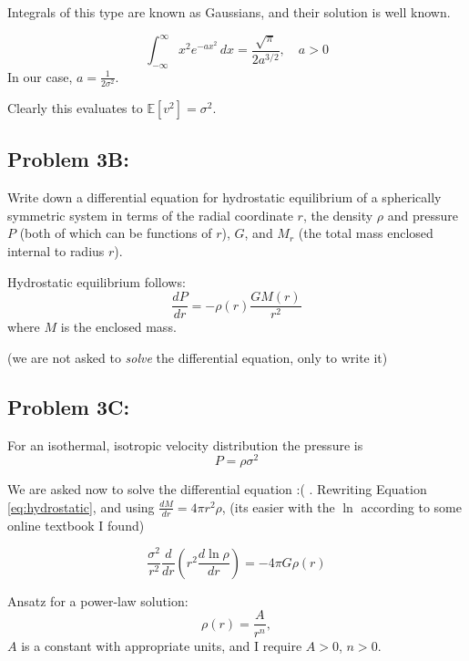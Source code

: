 Integrals of this type are known as Gaussians, and their solution is well known. 

\begin{equation}
    \int_{-\infty}^{\infty} x^2 e^{-a x^2} \, dx = \frac{\sqrt{\pi}}{2 a^{3/2}}, \quad a > 0
\end{equation}
    In our case, $a = \frac{1}{2 \sigma^2}$. 

Clearly this evaluates to $\boxed{\mathbb{E}[v^2]  = \sigma^2}$.


\subsection*{Problem 3B:}
Write down a differential equation for hydrostatic equilibrium of a spherically symmetric system in terms of the radial coordinate $r$, the density $\rho$ and pressure $P$ (both of which can be functions of $r$), $G$, and $M_r$ (the total mass enclosed internal to radius $r$).


Hydrostatic equilibrium follows:
\begin{equation} \label{eq:hydrostatic}
    \boxed{\frac{dP}{dr} = -\rho(r) \frac{GM(r)}{r^2}}
\end{equation}
where $M$ is the enclosed mass. 

(we are not asked to\textit{ solve} the differential equation, only to write it)


\subsection*{Problem 3C:}
For an isothermal, isotropic velocity distribution the pressure is
\begin{equation}
    P = \rho\sigma^2 
\end{equation}

We are asked now to solve the differential equation :( . Rewriting Equation \ref{eq:hydrostatic}, and using $\frac{dM}{dr} = 4\pi r^2 \rho $, (its easier with the $\ln$ according to some online textbook I found)

\begin{equation}\label{eq:ode_3c}
    \frac{\sigma^2}{r^2} \frac{d}{dr}(r^2 \frac{d\ln{\rho}}{dr}) = -4\pi G \rho(r)
\end{equation}

Ansatz for a power-law solution:
\begin{equation}
    \rho(r) = \frac{A}{r^n},
\end{equation}
$A$ is a constant with appropriate units, and  I require $A>0$, $n>0$.

